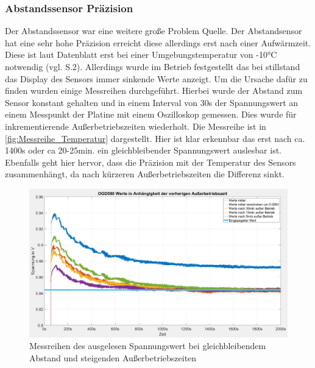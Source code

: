 \subsubsection{Abstandssensor Präzision}
Der Abstandssensor war eine weitere große Problem Quelle. Der Abstandsensor hat eine sehr hohe Präzision erreicht diese allerdings erst nach einer Aufwärmzeit. Diese ist laut Datenblatt erst bei einer Umgebungstemperatur von -10°C notwendig (vgl. \cite{OGD580_Datasheet} S.2). Allerdings wurde im Betrieb festgestellt das bei stillstand das Display des Sensors immer sinkende Werte anzeigt. Um die Ursache dafür zu finden wurden einige Messreihen durchgeführt. Hierbei wurde der Abstand zum Sensor konstant gehalten und in einem Interval von 30s der Spannungswert an einem Messpunkt der Platine mit einem Oszilloskop gemessen. Dies wurde für inkrementierende Außerbetriebszeiten wiederholt. Die Messreihe ist in \autoref{fig:Messreihe_Temperatur} dargestellt. Hier ist klar erkennbar das erst nach ca. 1400s oder ca 20-25min. ein gleichbleibender Spannungswert auslesbar ist. Ebenfalls geht hier hervor, dass die Präzision mit der Temperatur des Sensors zusammenhängt, da nach kürzeren Außerbetriebszeiten die Differenz sinkt.
\begin{figure}[H]
	\centering
	\includegraphics[width=1.0\textwidth]{images/Hardware/Abstandssensor_plot_highres.PNG}
	\caption{Messreihen des ausgelesen Spannungswert bei gleichbleibendem Abstand und steigenden Außerbetriebszeiten}
	\label{fig:Messreihe_Temperatur}
\end{figure}

